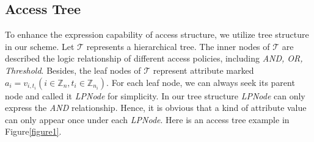 \documentclass[smallextended]{svjour3}       %
\begin{document}
\subsection{Access Tree}

	To enhance the expression capability of access structure, we utilize tree structure in our scheme. 
	Let $\mathcal{T}$ represents a hierarchical tree. 
	The inner nodes of $\mathcal{T}$ are described the logic relationship of different access policies, including \textit{AND, OR, Threshold}. 
	Besides, the leaf nodes of $\mathcal{T}$ represent attribute marked $a_i=v_{i,t_i}(i \in \mathbb{Z}_n,t_i \in \mathbb{Z}_{n_i})$. 
	For each leaf node, we can always seek its parent node and called it \textit{LPNode} for simplicity. In our tree structure \textit{LPNode} can only express the \textit{AND} relationship.
	Hence, it is obvious that a kind of attribute value can only appear once under each \textit{LPNode}. 
	Here is an access tree example in Figure\ref{figure1}.
\end{document}
